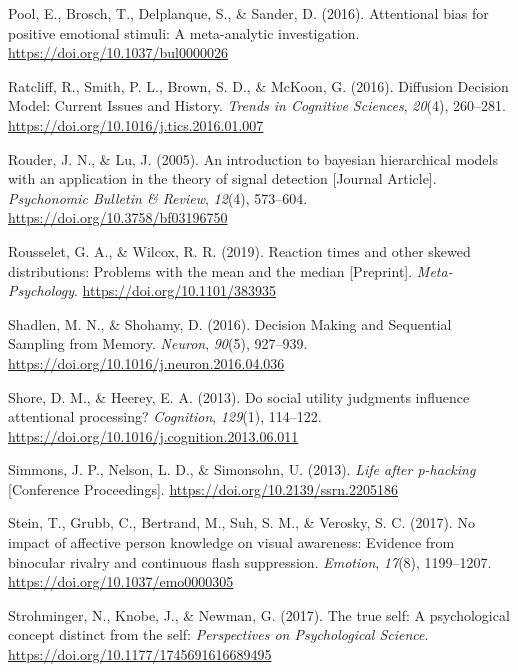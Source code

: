 \documentclass[
  man]{apa6}
\newlength{\cslhangindent}
\newlength{\cslentryspacingunit} %
\newenvironment{CSLReferences}[2] %
 {%
  \setlength{\parindent}{0pt}
  \ifodd #1
  \let\oldpar\par
  \def\par{\hangindent=\cslhangindent\oldpar}
  \fi
  \setlength{\parskip}{#2\cslentryspacingunit}
 }%
 {}
\begin{document}
\begin{CSLReferences}{1}{0}
\leavevmode{}%
Pool, E., Brosch, T., Delplanque, S., \& Sander, D. (2016). Attentional bias for positive emotional stimuli: A meta-analytic investigation. \url{https://doi.org/10.1037/bul0000026}

\leavevmode{}%
Ratcliff, R., Smith, P. L., Brown, S. D., \& McKoon, G. (2016). Diffusion {Decision} {Model}: {Current} {Issues} and {History}. \emph{Trends in Cognitive Sciences}, \emph{20}(4), 260--281. \url{https://doi.org/10.1016/j.tics.2016.01.007}

\leavevmode{}%
Rouder, J. N., \& Lu, J. (2005). An introduction to bayesian hierarchical models with an application in the theory of signal detection {[}Journal Article{]}. \emph{Psychonomic Bulletin \& Review}, \emph{12}(4), 573--604. \url{https://doi.org/10.3758/bf03196750}

\leavevmode{}%
Rousselet, G. A., \& Wilcox, R. R. (2019). Reaction times and other skewed distributions: Problems with the mean and the median {[}Preprint{]}. \emph{Meta-Psychology}. \url{https://doi.org/10.1101/383935}

\leavevmode{}%
Shadlen, M. N., \& Shohamy, D. (2016). Decision {Making} and {Sequential} {Sampling} from {Memory}. \emph{Neuron}, \emph{90}(5), 927--939. \url{https://doi.org/10.1016/j.neuron.2016.04.036}

\leavevmode{}%
Shore, D. M., \& Heerey, E. A. (2013). Do social utility judgments influence attentional processing? \emph{Cognition}, \emph{129}(1), 114--122. \url{https://doi.org/10.1016/j.cognition.2013.06.011}

\leavevmode{}%
Simmons, J. P., Nelson, L. D., \& Simonsohn, U. (2013). \emph{Life after p-hacking} {[}Conference Proceedings{]}. \url{https://doi.org/10.2139/ssrn.2205186}

\leavevmode{}%
Stein, T., Grubb, C., Bertrand, M., Suh, S. M., \& Verosky, S. C. (2017). No impact of affective person knowledge on visual awareness: Evidence from binocular rivalry and continuous flash suppression. \emph{Emotion}, \emph{17}(8), 1199--1207. \url{https://doi.org/10.1037/emo0000305}

\leavevmode{}%
Strohminger, N., Knobe, J., \& Newman, G. (2017). The true self: A psychological concept distinct from the self: \emph{Perspectives on Psychological Science}. \url{https://doi.org/10.1177/1745691616689495}


\end{CSLReferences}
\end{document}
